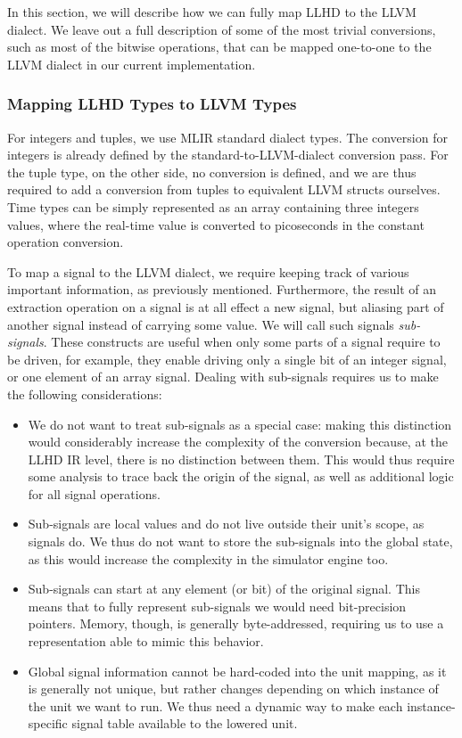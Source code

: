 In this section, we will describe how we can fully map LLHD to the LLVM dialect. We leave out a full description of some of the most trivial conversions, such as most of the bitwise operations, that can be mapped one-to-one to the LLVM dialect in our current implementation.


\subsubsection{Mapping LLHD Types to LLVM Types}
\label{sec:typeconv}
For integers and tuples, we use MLIR standard dialect types. The conversion for integers is already defined by the standard-to-LLVM-dialect conversion pass. For the tuple type, on the other side, no conversion is defined, and we are thus required to add a conversion from tuples to equivalent LLVM structs ourselves. Time types can be simply represented as an array containing three integers values, where the real-time value is converted to picoseconds in the constant operation conversion.

To map a signal to the LLVM dialect, we require keeping track of various important information, as previously mentioned. Furthermore, the result of an extraction operation on a signal is at all effect a new signal, but aliasing part of another signal instead of carrying some value. We will call such signals \textit{sub-signals}. These constructs are useful when only some parts of a signal require to be driven, for example, they enable driving only a single bit of an integer signal, or one element of an array signal.
Dealing with sub-signals requires us to make the following considerations:

\begin{itemize}
    \item We do not want to treat sub-signals as a special case: making this distinction would considerably increase the complexity of the conversion because, at the LLHD IR level, there is no distinction between them. This would thus require some analysis to trace back the origin of the signal, as well as additional logic for all signal operations.
    \item Sub-signals are local values and do not live outside their unit's scope, as signals do. We thus do not want to store the sub-signals into the global state, as this would increase the complexity in the simulator engine too.
    \item Sub-signals can start at any element (or bit) of the original signal. This means that to fully represent sub-signals we would need bit-precision pointers. Memory, though, is generally byte-addressed, requiring us to use a representation able to mimic this behavior.
    \item Global signal information cannot be hard-coded into the unit mapping, as it is generally not unique, but rather changes depending on which instance of the unit we want to run. We thus need a dynamic way to make each instance-speciﬁc signal table available to the lowered unit.
\end{itemize}

